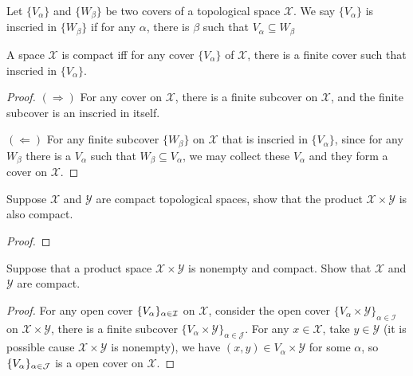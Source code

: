 \documentclass[./main.tex]{subfiles}
\begin{document}
\begin{definition}
  Let $\{ V_\alpha \}$ and $\{ W_\beta \}$ be two covers of a topological space
  $\mathcal{X}$. We say $\{ V_\alpha \}$ is inscried in $\{ W_\beta \}$
  if for any $\alpha$, there is $\beta$ such that $V_\alpha \subseteq W_\beta$
\end{definition}

\begin{theorem}
  A space $\mathcal{X}$ is compact iff for any cover $\{ V_\alpha \}$ of $\mathcal{X}$,
  there is a finite cover such that inscried in $\{ V_\alpha \}$.
\end{theorem}
\begin{proof}
  $(\Rightarrow)$ For any cover on $\mathcal{X}$, there is a finite subcover on $\mathcal{X}$,
  and the finite subcover is an inscried in itself.\par
  $(\Leftarrow)$ For any finite subcover $\{ W_\beta \}$ on $\mathcal{X}$ that is inscried in $\{ V_\alpha \}$,
  since for any $W_\beta$ there is a $V_\alpha$ such that $W_\beta \subseteq V_\alpha$,
  we may collect these $V_\alpha$ and they form a cover on $\mathcal{X}$.
\end{proof}

\begin{theorem}
  Suppose $\mathcal{X}$ and $\mathcal{Y}$ are compact topological spaces,
  show that the product $\mathcal{X} \times \mathcal{Y}$ is also compact.
\end{theorem}
\begin{proof}

\end{proof}

\begin{theorem}
  Suppose that a product space $\mathcal{X} \times \mathcal{Y}$ is nonempty and compact.
  Show that $\mathcal{X}$ and $\mathcal{Y}$ are compact.
\end{theorem}
\begin{proof}
  For any open cover $\iset{\mathcal{I}}{V}$ on $\mathcal{X}$,
  consider the open cover $\{ V_\alpha \times \mathcal{Y} \}_{\alpha \in \mathcal{I}}$
  on $\mathcal{X} \times \mathcal{Y}$,
  there is a finite subcover
  $\{ V_\alpha \times \mathcal{Y} \}_{\alpha \in \mathcal{J}}$.
  For any $x \in \mathcal{X}$, take $y \in \mathcal{Y}$ (it is possible cause $\mathcal{X} \times \mathcal{Y}$ is nonempty),
  we have $(x, y) \in V_\alpha \times \mathcal{Y}$ for some $\alpha$,
  so $\iset{\mathcal{J}}{V}$ is a open cover on $\mathcal{X}$.
\end{proof}
\end{document}
